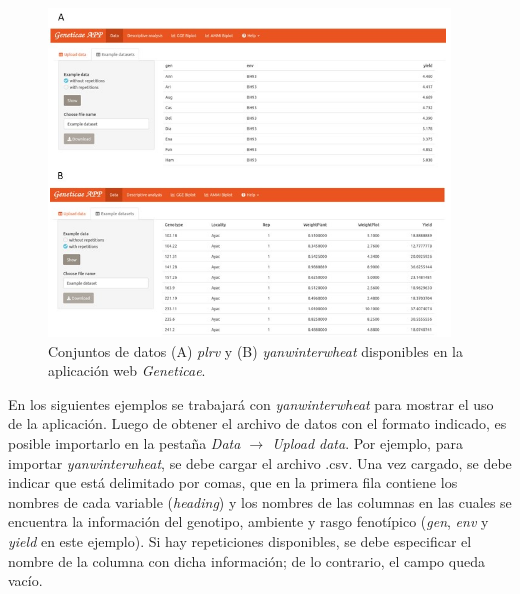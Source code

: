  \begin{figure}[h]
	\begin{center}
		\includegraphics[width=0.95\textwidth]{./Graficos/www/exampledata.png}
	\end{center}
	\caption{Conjuntos de datos (A) \emph{plrv} y (B) \emph{yanwinterwheat} disponibles en la aplicación web \emph{Geneticae}.}
	\label{fig:dataexample}
\end{figure}

En los siguientes ejemplos se trabajará con \emph{yanwinterwheat} para mostrar el uso de la aplicación. Luego de obtener el archivo de datos con el formato indicado, es posible importarlo en la pestaña \emph{Data $\rightarrow$ Upload data}. Por ejemplo, para importar \emph{yanwinterwheat}, se debe cargar el archivo .csv. Una vez cargado, se debe indicar que está delimitado por comas, que en la primera fila contiene los nombres de cada variable (\emph{heading}) y los nombres de las columnas en las cuales se encuentra la información del genotipo, ambiente y rasgo fenotípico (\emph{gen}, \emph{env} y \emph{yield} en este ejemplo). Si hay repeticiones disponibles, se debe especificar el nombre de la columna con dicha información; de lo contrario, el campo queda vacío. 

